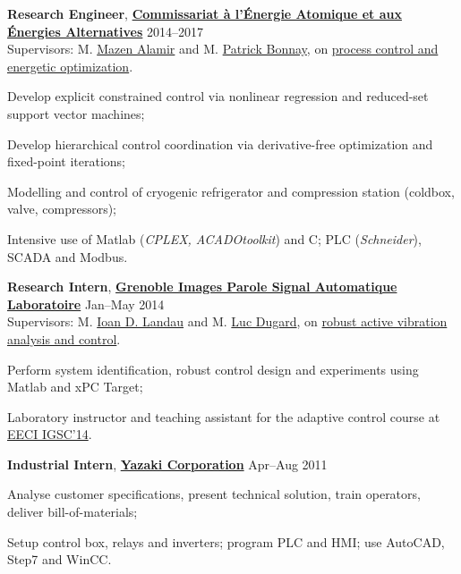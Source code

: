 \documentclass[a4paper,11pt]{article}
\begin{document}
	\textbf{Research Engineer},
	\href{http://www.cea.fr/}{\textbf{Commissariat \`{a} l'\'{E}nergie Atomique et aux \'{E}nergies Alternatives}}
	\hfill {2014--2017}\\
	Supervisors: M. \href{http://www.mazenalamir.fr/home/}{Mazen Alamir} and M. \href{https://www.researchgate.net/profile/P_Bonnay}{Patrick Bonnay}, on \href{https://vuongvtrinh.github.io/project/cryogenic-refrigerator/}{process control and energetic optimization}.
	\begin{innerlist}
		\item Develop explicit constrained control via nonlinear regression and reduced-set support vector machines;
		\item Develop hierarchical control coordination via derivative-free optimization and fixed-point iterations;
		\item Modelling and control of cryogenic refrigerator and compression station (coldbox, valve, compressors);
		\item Intensive use of Matlab (\emph{CPLEX, ACADOtoolkit}) and C; PLC (\emph{Schneider}), SCADA and Modbus.
	\end{innerlist}
	
	\vspace{0.1cm}
	
	\textbf{Research Intern},
	\href{http://www.gipsa-lab.fr/}{\textbf{Grenoble Images Parole Signal Automatique Laboratoire}}
	\hfill {Jan--May 2014}\\
	Supervisors: M. \href{https://www.gipsa-lab.grenoble-inp.fr/~ioandore.landau/}{Ioan D. Landau} and M. \href{https://www.researchgate.net/profile/Luc_Dugard}{Luc Dugard}, on \href{https://www.gipsa-lab.grenoble-inp.fr/~ioandore.landau/benchmark_adaptive_regulation/}{robust active vibration analysis and control}.
	\begin{innerlist}
		\item Perform system identification, robust control design and experiments using Matlab and xPC Target;
		\item  Laboratory instructor and teaching assistant for the adaptive control course at \href{http://www.eeci-igsc.eu/}{EECI IGSC'14}.
	\end{innerlist}
	
	\vspace{0.1cm}
	
	\textbf{Industrial Intern},
	\href{http://www.yhv.com.vn}{\textbf{Yazaki Corporation}}
	\hfill {Apr--Aug 2011}
	\begin{innerlist}
		\item Analyse customer specifications, present technical solution, train operators, deliver bill-of-materials;
		\item Setup control box, relays and inverters; program PLC and HMI; use AutoCAD, Step7 and WinCC.
	\end{innerlist}
	
\end{document}
